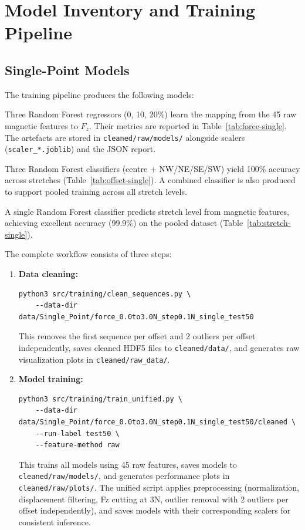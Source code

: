 \documentclass[11pt,a4paper]{article}
\begin{document}
\section{Model Inventory and Training Pipeline}
\subsection{Single-Point Models}
The training pipeline produces the following models:

\begin{description}[leftmargin=1.5em]
    \item[Per-stretch force regressors.] Three Random Forest regressors (0, 10, 20\%) learn the mapping
          from the 45 raw magnetic features to \(F_z\). Their metrics are reported in
          Table~\ref{tab:force-single}. The artefacts are stored in
          \texttt{cleaned/raw/models/} alongside scalers (\texttt{scaler\_*.joblib}) and the JSON report.
    \item[Per-stretch press location classifiers.] Three Random Forest classifiers (centre + NW/NE/SE/SW)
          yield 100\% accuracy across stretches (Table~\ref{tab:offset-single}). 
          A combined classifier is also produced to support pooled training across all stretch levels.
    \item[Stretch classifier.] A single Random Forest classifier predicts stretch level from magnetic features,
          achieving excellent accuracy (99.9\%) on the pooled dataset (Table~\ref{tab:stretch-single}).
    \item[Training workflow.] The complete workflow consists of three steps:
          \begin{enumerate}[leftmargin=1.5em]
              \item \textbf{Data cleaning:}
\begin{verbatim}
python3 src/training/clean_sequences.py \
    --data-dir data/Single_Point/force_0.0to3.0N_step0.1N_single_test50
\end{verbatim}
                    This removes the first sequence per offset and 2 outliers per offset independently, saves cleaned HDF5 files to \texttt{cleaned/data/}, and generates raw visualization plots in \texttt{cleaned/raw\_data/}.
              \item \textbf{Model training:}
\begin{verbatim}
python3 src/training/train_unified.py \
    --data-dir data/Single_Point/force_0.0to3.0N_step0.1N_single_test50/cleaned \
    --run-label test50 \
    --feature-method raw
\end{verbatim}
                    This trains all models using 45 raw features, saves models to \texttt{cleaned/raw/models/}, and generates performance plots in \texttt{cleaned/raw/plots/}. The unified script applies preprocessing (normalization, displacement filtering, Fz cutting at 3N, outlier removal with 2 outliers per offset independently),
                    and saves models with their corresponding scalers for consistent inference.
          \end{enumerate}
\end{description}
\end{document}
